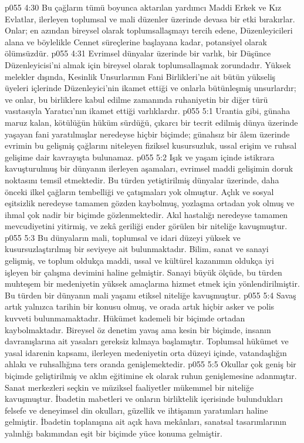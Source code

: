 \vs p055 4:30 Bu çağların tümü boyunca aktarılan yardımcı Maddi Erkek ve Kız Evlatlar, ilerleyen toplumsal ve mali düzenler üzerinde devasa bir etki bırakırlar. Onlar; en azından bireysel olarak toplumsallaşmayı tercih edene, Düzenleyicileri alana ve böylelikle Cennet süreçlerine başlayana kadar, potansiyel olarak ölümsüzdür.
\vs p055 4:31 Evrimsel dünyalar üzerinde bir varlık, bir Düşünce Düzenleyicisi’ni almak için bireysel olarak toplumsallaşmak zorundadır. Yüksek melekler dışında, Kesinlik Unsurlarının Fani Birlikleri’ne ait bütün yükseliş üyeleri içlerinde Düzenleyici’nin ikamet ettiği ve onlarla bütünleşmiş unsurlardır; ve onlar, bu birliklere kabul edilme zamanında ruhaniyetin bir diğer türü vasıtasıyla Yaratıcı’nın ikamet ettiği varlıklardır.
\vs p055 5:1 Urantia gibi, günaha maruz kalan, kötülüğün hüküm sürdüğü, çıkarcı bir tecrit edilmiş dünya üzerinde yaşayan fani yaratılmışlar neredeyse hiçbir biçimde; günahsız bir âlem üzerinde evrimin bu gelişmiş çağlarını niteleyen fiziksel kusursuzluk, ussal erişim ve ruhsal gelişime dair kavrayışta bulunamaz.
\vs p055 5:2 Işık ve yaşam içinde istikrara kavuşturulmuş bir dünyanın ilerleyen aşamaları, evrimsel maddi gelişimin doruk noktasını temsil etmektedir. Bu türden yetiştirilmiş dünyalar üzerinde, daha önceki ilkel çağların tembelliği ve çatışmaları yok olmuştur. Açlık ve sosyal eşitsizlik neredeyse tamamen gözden kaybolmuş, yozlaşma ortadan yok olmuş ve ihmal çok nadir bir biçimde gözlenmektedir. Akıl hastalığı neredeyse tamamen mevcudiyetini yitirmiş, ve zekâ geriliği ender görülen bir niteliğe kavuşmuştur.
\vs p055 5:3 Bu dünyaların mali, toplumsal ve idari düzeyi yüksek ve kusursuzlaştırılmış bir seviyeye ait bulunmaktadır. Bilim, sanat ve sanayi gelişmiş, ve toplum oldukça maddi, ussal ve kültürel kazanımın oldukça iyi işleyen bir çalışma devimini haline gelmiştir. Sanayi büyük ölçüde, bu türden muhteşem bir medeniyetin yüksek amaçlarına hizmet etmek için yönlendirilmiştir. Bu türden bir dünyanın mali yaşamı etiksel niteliğe kavuşmuştur.
\vs p055 5:4 Savaş artık yalnızca tarihin bir konusu olmuş, ve orada artık hiçbir asker ve polis kuvveti bulunmamaktadır. Hükümet kademeli bir biçimde ortadan kaybolmaktadır. Bireysel öz denetim yavaş ama kesin bir biçimde, insanın davranışlarına ait yasaları gereksiz kılmaya başlamıştır. Toplumsal hükümet ve yasal idarenin kapsamı, ilerleyen medeniyetin orta düzeyi içinde, vatandaşlığın ahlakı ve ruhsallığına ters oranda genişlemektedir.
\vs p055 5:5 Okullar çok geniş bir biçimde geliştirilmiş ve aklın eğitimine ek olarak ruhun genişlemesine adanmıştır. Sanat merkezleri seçkin ve müziksel faaliyetler mükemmel bir niteliğe kavuşmuştur. İbadetin mabetleri ve onların birliktelik içerisinde bulundukları felsefe ve deneyimsel din okulları, güzellik ve ihtişamın yaratımları haline gelmiştir. İbadetin toplanışına ait açık hava mekânları, sanatsal tasarımlarının yalınlığı bakımından eşit bir biçimde yüce konuma gelmiştir.

